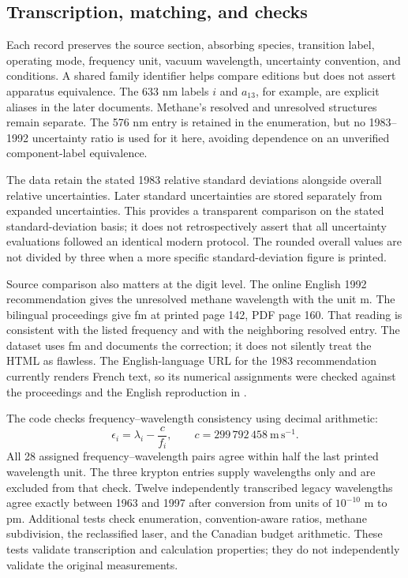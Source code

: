\documentclass[11pt,a4paper]{article}
\begin{document}
\subsection{Transcription, matching, and checks}
Each record preserves the source section, absorbing species, transition label, operating mode, frequency unit, vacuum wavelength, uncertainty convention, and conditions. A shared family identifier helps compare editions but does not assert apparatus equivalence. The 633 nm labels $i$ and $a_{13}$, for example, are explicit aliases in the later documents. Methane's resolved and unresolved structures remain separate. The 576 nm entry is retained in the enumeration, but no 1983--1992 uncertainty ratio is used for it here, avoiding dependence on an unverified component-label equivalence.

The data retain the stated 1983 relative standard deviations alongside overall relative uncertainties. Later standard uncertainties are stored separately from expanded uncertainties. This provides a transparent comparison on the stated standard-deviation basis; it does not retrospectively assert that all uncertainty evaluations followed an identical modern protocol. The rounded overall values are not divided by three when a more specific standard-deviation figure is printed.

Source comparison also matters at the digit level. The online English 1992 recommendation gives the unresolved methane wavelength with the unit m. The bilingual proceedings give fm at printed page 142, PDF page 160. That reading is consistent with the listed frequency and with the neighboring resolved entry. The dataset uses fm and documents the correction; it does not silently treat the HTML as flawless. The English-language URL for the 1983 recommendation currently renders French text, so its numerical assignments were checked against the proceedings and the English reproduction in \citet[pp.~13--14]{jennings1987}.

The code checks frequency--wavelength consistency using decimal arithmetic:
\begin{equation}
 \epsilon_i=\lambda_i-\frac{c}{f_i},\qquad c=299\,792\,458\ \mathrm{m\,s^{-1}}.
\end{equation}
All 28 assigned frequency--wavelength pairs agree within half the last printed wavelength unit. The three krypton entries supply wavelengths only and are excluded from that check. Twelve independently transcribed legacy wavelengths agree exactly between 1963 and 1997 after conversion from units of $10^{-10}$ m to pm. Additional tests check enumeration, convention-aware ratios, methane subdivision, the reclassified laser, and the Canadian budget arithmetic. These tests validate transcription and calculation properties; they do not independently validate the original measurements.
\end{document}
